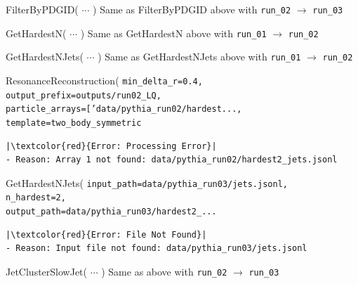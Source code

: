\documentclass[11pt,oneside]{article}
\numberwithin{equation}{section}
\begin{document}
\begin{orchestralagentmessage}
    \begin{orchestraltoolmessage}{FilterByPDGID( $\cdots$ )
        }
    Same as \textsf{FilterByPDGID} above with \texttt{run\_02} $\to$ \texttt{run\_03}
    \end{orchestraltoolmessage}


    \begin{orchestraltoolmessage}{GetHardestN( $\cdots$ )}
    Same as \textsf{GetHardestN} above with \texttt{run\_01} $\to$ \texttt{run\_02}
    \end{orchestraltoolmessage}

    \begin{orchestraltoolmessage}{GetHardestNJets( $\cdots$ )}
    Same as \textsf{GetHardestNJets} above with \texttt{run\_01} $\to$ \texttt{run\_02}
    \end{orchestraltoolmessage}

    \begin{orchestraltoolmessageml}{ResonanceReconstruction( \texttt{min\_delta\_r=0.4, output\_prefix=outputs/run02\_LQ,}\\\hphantom{ResonanceReconstruction(} \texttt{particle\_arrays=['data/pythia\_run02/hardest...,}\\\hphantom{ResonanceReconstruction(}
    \texttt{template=two\_body\_symmetric}}
\begin{verbatim}
|\textcolor{red}{Error: Processing Error}|
- Reason: Array 1 not found: data/pythia_run02/hardest2_jets.jsonl
\end{verbatim}
    \end{orchestraltoolmessageml}

    \begin{orchestraltoolmessageml}{GetHardestNJets(  \texttt{input\_path=data/pythia\_run03/jets.jsonl,}\\\hphantom{GetHardestNJets(} 
            \texttt{n\_hardest=2,}\\\hphantom{GetHardestNJets(}
            \texttt{output\_path=data/pythia\_run03/hardest2\_...}}
\begin{verbatim}
|\textcolor{red}{Error: File Not Found}|
- Reason: Input file not found: data/pythia_run03/jets.jsonl
\end{verbatim}
    \end{orchestraltoolmessageml}

    \begin{orchestraltoolmessage}{JetClusterSlowJet( $\cdots$ )}
        Same as above with \texttt{run\_02} $\to$ \texttt{run\_03}
    \end{orchestraltoolmessage}


\end{orchestralagentmessage}
\end{document}
